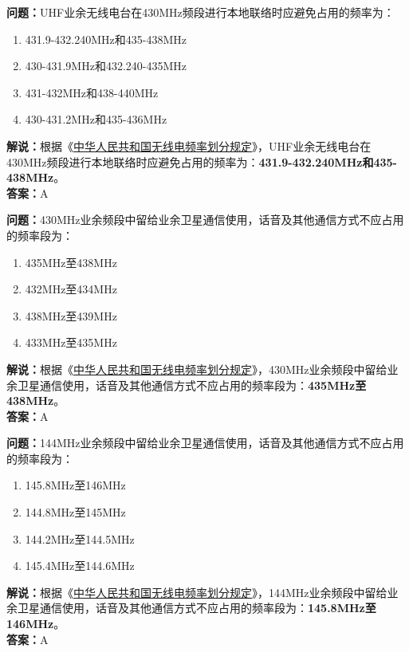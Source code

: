 \textbf{问题：}UHF业余无线电台在430MHz频段进行本地联络时应避免占用的频率为：
\begin{enumerate}[label=\Alph*), leftmargin=1.5cm]
  \item 431.9-432.240MHz和435-438MHz
  \item 430-431.9MHz和432.240-435MHz
  \item 431-432MHz和438-440MHz
  \item 430-431.2MHz和435-436MHz
\end{enumerate}
\textbf{解说：}根据《\href{https://www.miit.gov.cn/zwgk/zcwj/wjfb/txy/art/2020/art_066386284cd2449493586c81ccafed11.html}{中华人民共和国无线电频率划分规定}》，UHF业余无线电台在430MHz频段进行本地联络时应避免占用的频率为：\textbf{431.9-432.240MHz和435-438MHz}。\\\textbf{答案：}A%

\textbf{问题：}430MHz业余频段中留给业余卫星通信使用，话音及其他通信方式不应占用的频率段为：
\begin{enumerate}[label=\Alph*), leftmargin=1.5cm]
  \item 435MHz至438MHz
  \item 432MHz至434MHz
  \item 438MHz至439MHz
  \item 433MHz至435MHz
\end{enumerate}
\textbf{解说：}根据《\href{https://www.miit.gov.cn/zwgk/zcwj/wjfb/txy/art/2020/art_066386284cd2449493586c81ccafed11.html}{中华人民共和国无线电频率划分规定}》，430MHz业余频段中留给业余卫星通信使用，话音及其他通信方式不应占用的频率段为：\textbf{435MHz至438MHz}。\\\textbf{答案：}A

\textbf{问题：}144MHz业余频段中留给业余卫星通信使用，话音及其他通信方式不应占用的频率段为：
\begin{enumerate}[label=\Alph*), leftmargin=1.5cm]
  \item 145.8MHz至146MHz
  \item 144.8MHz至145MHz
  \item 144.2MHz至144.5MHz
  \item 145.4MHz至144.6MHz
\end{enumerate}
\textbf{解说：}根据《\href{https://www.miit.gov.cn/zwgk/zcwj/wjfb/txy/art/2020/art_066386284cd2449493586c81ccafed11.html}{中华人民共和国无线电频率划分规定}》，144MHz业余频段中留给业余卫星通信使用，话音及其他通信方式不应占用的频率段为：\textbf{145.8MHz至146MHz}。\\\textbf{答案：}A%

